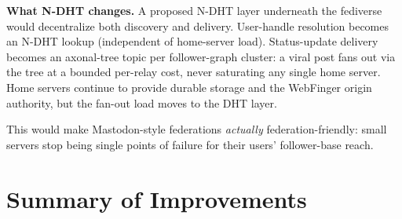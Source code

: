 \documentclass[twoside,nobib]{tufte-book}
\newcommand{\NDHT}{N-DHT\xspace}
\begin{document}
\textbf{What \NDHT changes.} A proposed \NDHT layer underneath
the fediverse would decentralize both discovery and delivery.
User-handle resolution becomes an \NDHT lookup (independent of
home-server load). Status-update delivery becomes an
axonal-tree topic per follower-graph cluster: a viral post fans
out via the tree at a bounded per-relay cost, never saturating
any single home server. Home servers continue to provide
durable storage and the WebFinger origin authority, but the
fan-out load moves to the DHT layer.

This would make Mastodon-style federations \emph{actually}
federation-friendly: small servers stop being single points of
failure for their users' follower-base reach.

\section{Summary of Improvements}
\end{document}
